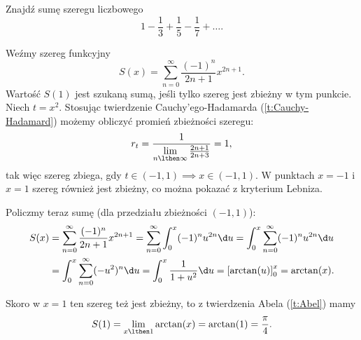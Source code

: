 \begin{example}
    Znajdź sumę szeregu liczbowego
    \[ 1 - \frac{1}{3} + \frac{1}{5} - \frac{1}{7} + \ldots. \]
\end{example}
\begin{solution}
    Weźmy szereg funkcyjny
    \[ S(x) = \sum_{n=0}^\infty \frac{(-1)^n}{2n+1}x^{2n+1}. \]
    Wartość $S(1)$ jest szukaną sumą, jeśli tylko szereg jest zbieżny w tym punkcie. Niech $t = x^2$. Stosując twierdzenie Cauchy'ego-Hadamarda (\ref{t:Cauchy-Hadamard}) możemy obliczyć promień zbieżności szeregu:
    \[ r_t = \frac{1}{\lim\limits_{n\lthen\infty}\frac{2n+1}{2n+3}} = 1, \]
    tak więc szereg zbiega, gdy $t \in (-1, 1) \implies x \in (-1, 1)$. W punktach $x = -1$ i $x = 1$ szereg również jest zbieżny, co można pokazać z kryterium Lebniza.

    Policzmy teraz sumę (dla przedziału zbieżności $(-1, 1)$):
    \begin{align*}
        S(x) &= \sum_{n=0}^\infty \frac{(-1)^n}{2n+1}x^{2n+1} = \sum_{n=0}^\infty\int_0^x (-1)^n u^{2n} \d u = \int_0^x\sum_{n=0}^\infty (-1)^n u^{2n} \d u \\
        &= \int_0^x\sum_{n=0}^\infty (-u^2)^n \d u = \int_0^x \frac{1}{1 + u^2} \d u = \left[\arctan(u)\right]_0^x = \arctan(x).
    \end{align*}

    Skoro w $x = 1$ ten szereg też jest zbieżny, to z twierdzenia Abela (\ref{t:Abel}) mamy
    \[ S(1) = \lim_{x\lthen 1}\arctan(x) = \arctan(1) = \frac{\pi}{4}. \]
\end{solution}